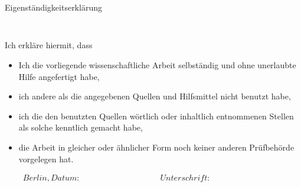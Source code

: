 \section*{}
\thispagestyle{empty}

\begin{verbatim}

\end{verbatim}

\begin{LARGE}Eigenständigkeitserklärung\end{LARGE}
\begin{verbatim}


\end{verbatim}

Ich erkläre hiermit, dass

\begin{itemize}
\item Ich die vorliegende wissenschaftliche Arbeit selbständig und ohne unerlaubte Hilfe angefertigt habe,
\item ich andere als die angegebenen Quellen und Hilfsmittel nicht benutzt habe,
\item ich die den benutzten Quellen wörtlich oder inhaltlich entnommenen Stellen als solche kenntlich gemacht 
habe, 
\item die Arbeit in gleicher oder ähnlicher Form noch keiner anderen Prüfbehörde vorgelegen hat.
\end{itemize}



\begin{displaymath}
\begin{array}{ll}
    Berlin, Datum:~~~~~~~~~~~~~~~~~~~~~~~~~~~~~~~~~~~~~~~~
    &
Unterschrift:~~~~~~~~~~~~~~~~~~~~~~~~~~~~~~~~~~~~~~~~

\end{array}
\end{displaymath}